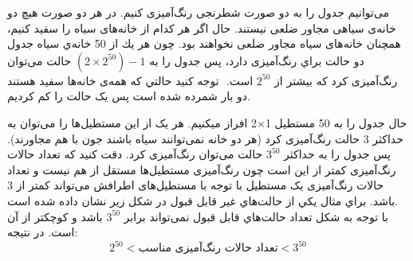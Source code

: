     \p
 می‌توانیم جدول را به دو صورت شطرنجی رنگ‌آمیزی ‌کنیم. در هر دو صورت هیچ دو خانه‌ی سیاهی مجاور ضلعی نیستند. 
 حال اگر هر کدام از خانه‌های سیاه را سفید کنیم، همچنان خانه‌های سیاه مجاور ضلعی نخواهند بود.
  چون هر يك از 50 خانه‌ي سياه جدول دو حالت براي رنگ‌آمیزی دارد،  
  پس جدول را به 
  $ (2 \times 2^{50})- 1 $ 
   حالت می‌توان رنگ‌آمیزی کرد که بیشتر از 
   $2^{50}$
  است.
  ‌  توجه كنيد حالتي كه همه‌ی خانه‌ها سفید هستند دو بار شمرده شده است پس یک حالت را کم کردیم.


    \p
     حال جدول را به 50 مستطیل 1×2 افراز میکنیم. هر یک از این مستطیل‌ها را می‌توان به حداکثر 3 حالت رنگ‌آمیزی کرد (هر دو خانه نمی‌توانند سیاه باشند جون با هم مجاورند). پس جدول را به حداکثر $3^{50}$ حالت می‌توان رنگ‌آمیزی کرد. دقت کنید که تعداد حالات رنگ‌آمیزی کمتر از این است چون رنگ‌آمیزی مستطیل‌ها مستقل از هم نیست و تعداد حالات رنگ‌آمیزی یک مستطیل با توجه با مستطیل‌های اطرافش می‌تواند کمتر از 3 باشد.
     براي مثال يكي از حالت‌هاي غير قابل قبول در شكل زير نشان داده شده است.
     \\  
      با توجه به شكل تعداد حالت‌هاي قابل قبول نمی‌تواند برابر 
      $3^{50}$
      باشد و كوچكتر از آن است.
    \p
    در نتیجه:
    $$2^{50} < \text{تعداد حالات رنگ‌آمیزی مناسب} < 3^{50}$$
